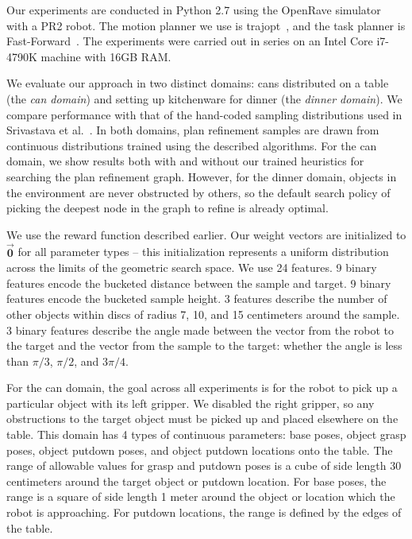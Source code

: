 Our experiments are conducted in Python 2.7 using the OpenRave simulator~\cite{Diankov_2008_6117} with a PR2 robot.
The motion planner we use is trajopt~\cite{schulman2013finding}, and the task planner is Fast-Forward~\cite{FF}.
The experiments were carried out in series on an Intel Core i7-4790K machine with 16GB RAM.

We evaluate our approach in two distinct domains: cans distributed on a table (the \emph{can domain})
and setting up kitchenware for dinner (the \emph{dinner domain}).
We compare performance with that of the hand-coded sampling distributions
used in Srivastava et al.~\cite{srivastava2014combined}. In both domains, plan refinement samples
are drawn from continuous distributions trained using the described algorithms. For the can domain, we
show results both with and without our trained heuristics for searching the plan refinement graph. However,
for the dinner domain, objects in the environment are never obstructed by others, so the default search policy
of picking the deepest node in the graph to refine is already optimal.

We use the reward function described earlier. Our weight
vectors are initialized to $\vec{\mathbf{0}}$ for all parameter types -- this
initialization represents a uniform distribution across the limits of the geometric search space.
We use 24 features. 9 binary features encode the bucketed distance between the sample
and target. 9 binary features encode the bucketed sample height. 3 features
describe the number of other objects within discs of radius 7, 10, and 15 centimeters around the
sample. 3 binary features describe the angle made between the vector from the
robot to the target and the vector from the sample to the target: whether the angle is less than
$\pi/3$, $\pi/2$, and $3\pi/4$.

For the can domain, the goal across all experiments is for the robot to pick up a particular object with its
left gripper. We disabled the right gripper, so any obstructions to the target object must be picked up and
placed elsewhere on the table. This domain has 4 types of continuous parameters: base poses, object grasp
poses, object putdown poses, and object putdown locations onto the table. The range of allowable values for
grasp and putdown poses is a cube of side length 30 centimeters around
the target object or putdown location. For base poses, the range is a
square of side length 1 meter around the object or location which the robot is approaching. For putdown locations,
the range is defined by the edges of the table.

